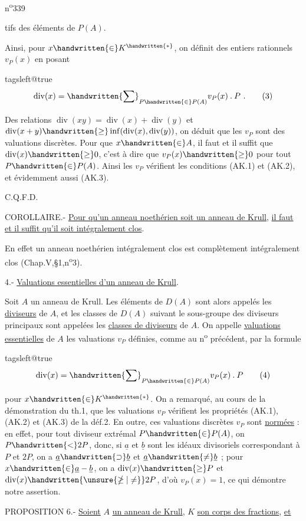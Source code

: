 

n\textsuperscript{o}339

tifs des éléments de $P(A)$.

Ainsi, pour $x\handwritten{\in}K^{\handwritten{*}}$, on définit des entiers rationnels $v_P(x)$ en posant

\begingroup\csname tagsleft@true\endcsname
\[ \operatorname{div}(x)=\handwritten{\sum}_{P\handwritten{\in}P(A)}v_P(x)\mathbin{.}P\ .\tag*{(3)} \]
\endgroup

Des relations $\operatorname{div}(xy)=\operatorname{div}(x)+\operatorname{div}(y)$ et $\operatorname{div}(x+y)\handwritten{\geq}\inf(\operatorname{div}(x),\operatorname{div}(y))$, on déduit que les $v_P$ sont des valuations discrètes. Pour que $x\handwritten{\in}A$, il faut et il suffit que $\operatorname{div}(x)\handwritten{\geq}0$, c'est à dire que $v_P(x)\handwritten{\geq}0$ pour tout $P\handwritten{\in}P(A)$. Ainsi les $v_P$ vérifient les conditions (AK.1) et (AK.2), et évidemment aussi (AK.3).

C.Q.F.D.

COROLLAIRE.- \uline{Pour qu'un anneau noethérien soit un anneau de Krull}, \uline{il faut et il suffit qu'il soit intégralement clos}.

En effet un anneau noethérien intégralement clos est complètement intégralement clos (Chap.V,\S1,n\textsuperscript{o}3).

4.- \uline{Valuations essentielles d'un anneau de Krull}.

Soit $A$ un anneau de Krull. Les éléments de $D(A)$ sont alors appelés les \uline{diviseurs} de $A$, et les classes de $D(A)$ suivant le sous-groupe des diviseurs principaux sont appelées les \uline{classes de diviseurs} de $A$. On appelle \uline{valuations essentielles} de $A$ les valuations $v_P$ définies, comme au n\textsuperscript{o} précédent, par la formule

\begingroup\csname tagsleft@true\endcsname
\[ \operatorname{div}(x)=\handwritten{\sum}_{P\handwritten{\in}P(A)}v_P(x)\mathbin{.}P\tag*{(4)} \]
\endgroup

pour $x\handwritten{\in} K^{\handwritten{*}}$. On a remarqué, au cours de la démonstration du th.1, que les valuations $v_P$ vérifient les propriétés (AK.1), (AK.2) et (AK.3) de la déf.2.
En outre, ces valuations discrètes $v_P$ sont \uline{normées} : en effet, pour tout diviseur extrémal $P\handwritten{\in}P(A)$, on  $P\handwritten{<}2P$, donc, si $\underline a$ et $\underline b$ sont les idéaux divisoriels correspondant à $P$ et $2P$, on a $\underline a\handwritten{\supset}\underline b$ et $\underline a\handwritten{\ne}\underline b$ ; pour $x\handwritten{\in}\underline a-\underline b$, on a $\operatorname{div}(x)\handwritten{\geq}P$ et $\operatorname{div}(x)\handwritten{\unsure{\ngeq|\ne}}2P$, d'où $v_P(x)=1$, ce qui démontre notre assertion.

PROPOSITION 6.- \uline{Soient} $A$ \uline{un anneau de Krull}, $K$ \uline{son corps des fractions}, \uline{et}

